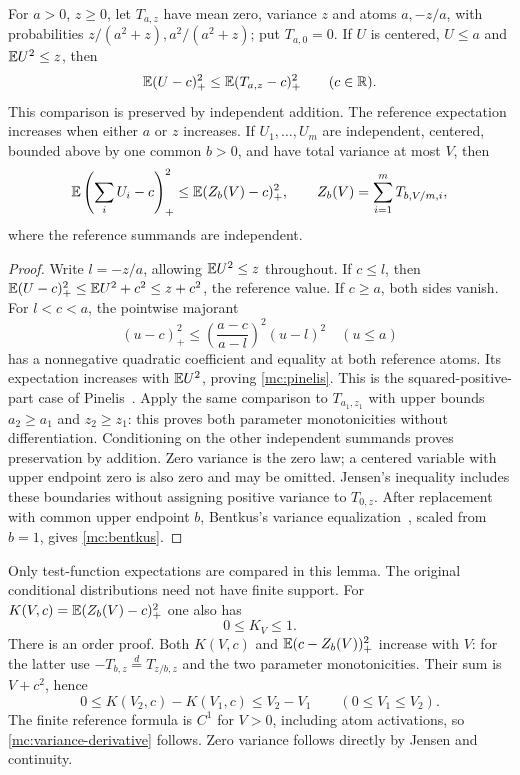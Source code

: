\begin{lemma}\label{mc:two-moment}
For $a>0$, $z\ge0$, let $T_{a,z}$ have mean zero, variance $z$
and atoms $a,-z/a$, with probabilities
$z/(a^2+z),a^2/(a^2+z)$; put $T_{a,0}=0$.
If $U$ is centered, $U\le a$ and $\mathbb E U^2\le z$, then
\begin{equation}\label{mc:pinelis}
 \mathbb E(U-c)_+^2\le\mathbb E(T_{a,z}-c)_+^2\qquad(c\in\mathbb R).
\end{equation}
This comparison is preserved by independent addition. The reference
expectation increases when either $a$ or $z$ increases.
If $U_1,\ldots,U_m$ are independent, centered, bounded above by
one common $b>0$, and have total variance at most $V$, then
\begin{equation}\label{mc:bentkus}
 \mathbb E\left(\sum_i U_i-c\right)_+^2
 \le \mathbb E(Z_b(V)-c)_+^2,
 \qquad Z_b(V)=\sum_{i=1}^mT_{b,V/m,i},
\end{equation}
where the reference summands are independent.
\end{lemma}
\begin{proof}
Write $l=-z/a$, allowing $\mathbb E U^2\le z$ throughout.
If $c\le l$, then $\mathbb E(U-c)_+^2\le\mathbb E U^2+c^2\le z+c^2$,
the reference value. If $c\ge a$, both
sides vanish. For $l<c<a$, the pointwise majorant
\[
 (u-c)_+^2\le\left(\frac{a-c}{a-l}\right)^2(u-l)^2
 \quad(u\le a)
\]
has a nonnegative quadratic coefficient and equality at both reference
atoms. Its expectation increases with $\mathbb E U^2$, proving
\eqref{mc:pinelis}. This is the squared-positive-part case of
Pinelis~\cite[Lemma~3.2 and Theorem~2.1]{Pinelis2006}.
Apply the same comparison to $T_{a_1,z_1}$ with upper bounds
$a_2\ge a_1$ and $z_2\ge z_1$: this proves both parameter
monotonicities without differentiation. Conditioning on the other
independent summands proves preservation by addition. Zero variance
is the zero law; a centered variable with upper endpoint zero is
also zero and may be omitted. Jensen's inequality includes these
boundaries without assigning positive variance to $T_{0,z}$.
After replacement with common upper endpoint $b$, Bentkus's
variance equalization~\cite[Lemma~4.5]{Bentkus2004}, scaled from
$b=1$, gives \eqref{mc:bentkus}.
\end{proof}

Only test-function expectations are compared in this lemma.
The original conditional distributions need not have finite support.
For $K(V,c)=\mathbb E(Z_b(V)-c)_+^2$ one also has
\begin{equation}\label{mc:variance-derivative}
 0\le K_V\le1.
\end{equation}
There is an order proof. Both $K(V,c)$ and
$\mathbb E(c-Z_b(V))_+^2$ increase with $V$: for the latter use
$-T_{b,z}\overset d=T_{z/b,z}$ and the two parameter monotonicities.
Their sum is $V+c^2$, hence
\[
 0\le K(V_2,c)-K(V_1,c)\le V_2-V_1\qquad(0\le V_1\le V_2).
\]
The finite reference formula is $C^1$ for $V>0$, including atom
activations, so \eqref{mc:variance-derivative} follows.
Zero variance follows directly by Jensen and continuity.

